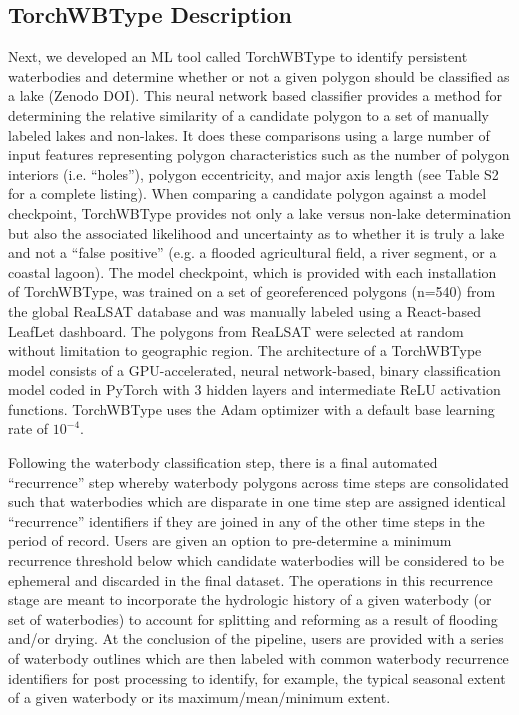 \documentclass{article}
\begin{document}
\subsection{TorchWBType Description}

Next, we developed an ML tool called TorchWBType to identify persistent waterbodies and determine whether or not a given polygon should be classified as a lake (Zenodo DOI). This neural network based classifier provides a method for determining the relative similarity of a candidate polygon to a set of manually labeled lakes and non-lakes. It does these comparisons using a large number of input features representing polygon characteristics such as the number of polygon interiors (i.e. “holes”), polygon eccentricity, and major axis length (see Table S2 for a complete listing). When comparing a candidate polygon against a model checkpoint, TorchWBType provides not only a lake versus non-lake determination but also the associated likelihood and uncertainty as to whether it is truly a lake and not a “false positive” (e.g. a flooded agricultural field, a river segment, or a coastal lagoon). The model checkpoint, which is provided with each installation of TorchWBType, was trained on a set of georeferenced polygons (n=540) from the global ReaLSAT database \citep{khandelwal2022realsat} and was manually labeled using a React-based LeafLet dashboard. The polygons from ReaLSAT were selected at random without limitation to geographic region. The architecture of a TorchWBType model consists of a GPU-accelerated, neural network-based, binary classification model coded in PyTorch with 3 hidden layers and intermediate ReLU activation functions. TorchWBType uses the Adam optimizer with a default base learning rate of $10^{-4}$. 

Following the waterbody classification step, there is a final automated “recurrence” step whereby waterbody polygons across time steps are consolidated such that waterbodies which are disparate in one time step are assigned identical “recurrence” identifiers if they are joined in any of the other time steps in the period of record. Users are given an option to pre-determine a minimum recurrence threshold below which candidate waterbodies will be considered to be ephemeral and discarded in the final dataset. The operations in this recurrence stage are meant to incorporate the hydrologic history of a given waterbody (or set of waterbodies) to account for splitting and reforming as a result of flooding and/or drying. At the conclusion of the pipeline, users are provided with a series of waterbody outlines which are then labeled with common waterbody recurrence identifiers for post processing to identify, for example, the typical seasonal extent of a given waterbody or its maximum/mean/minimum extent.
\end{document}
